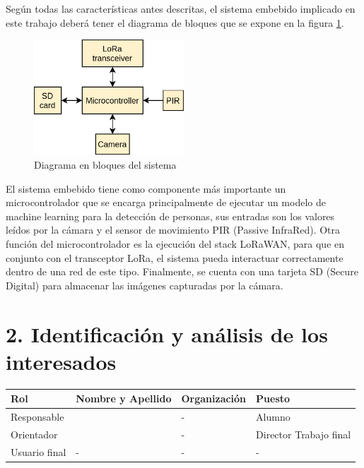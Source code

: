 \documentclass[
11pt, %
codirector, %
]{plan}
\begin{document}
\vspace{25px}

Según todas las características antes descritas, el sistema embebido implicado en este trabajo deberá tener el diagrama de bloques que se expone en la figura \ref{fig:blocks}.

\begin{figure}[htpb]
\centering 
\includegraphics[width=0.5\textwidth]{./fig/blocks.png}
\caption{Diagrama en bloques del sistema}
\label{fig:blocks}
\end{figure}

\vspace{25px}

El sistema embebido tiene como componente más importante un microcontrolador que se encarga principalmente de ejecutar un modelo de machine learning para la detección de personas, sus entradas son los valores leídos por la cámara y el sensor de movimiento PIR (Passive InfraRed). Otra función del microcontrolador es la ejecución del stack LoRaWAN, para que en conjunto con el transceptor LoRa, el sistema pueda interactuar correctamente dentro de una red de este tipo. Finalmente, se cuenta con una tarjeta SD (Secure Digital) para almacenar las imágenes capturadas por la cámara.

\section{2. Identificación y análisis de los interesados}
\label{sec:interesados}

\begin{table}[ht]
\begin{tabularx}{\linewidth}{@{}|l|X|X|l|@{}}
\hline
\rowcolor[HTML]{C0C0C0} 
Rol           & Nombre y Apellido & Organización 			& Puesto 	\\ \hline
Responsable   & \authorname		& -        				& Alumno 	\\ \hline
Orientador    & \supname			& - 						& Director Trabajo final \\ \hline
Usuario final & -                 & -             			& -       	\\ \hline
\end{tabularx}
\end{table}
\end{document}
